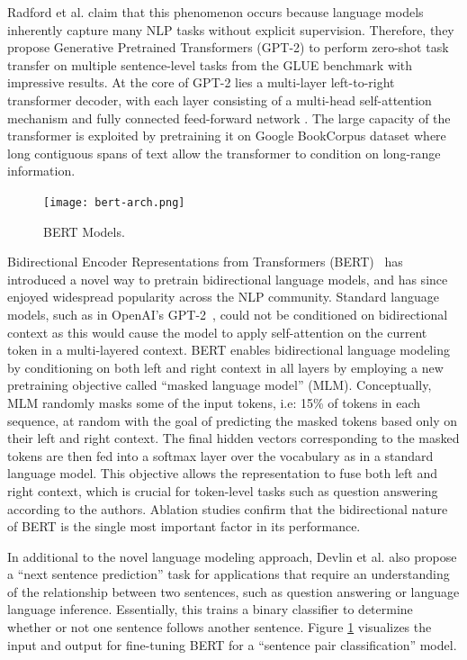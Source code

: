 Radford et al. \cite{radford2019language} claim that this phenomenon occurs because language models inherently capture many NLP tasks without explicit supervision.
Therefore, they propose Generative Pretrained Transformers (GPT-2) to perform zero-shot task transfer on multiple sentence-level tasks from the GLUE benchmark \cite{wang2018glue} with impressive results.
At the core of GPT-2 lies a multi-layer left-to-right transformer \cite{vaswani2017attention} decoder, with each layer consisting of a multi-head self-attention mechanism and fully connected feed-forward network \cite{radford2018improving}.
The large capacity of the transformer is exploited by pretraining it on Google BookCorpus dataset \cite{zhu2015aligning} where long contiguous spans of text allow the transformer to condition on long-range information.

\begin{figure}[b!]
\centering
  \texttt{[image: bert-arch.png]}
\caption{BERT Models.}
\label{fig:bert}
\end{figure}

Bidirectional Encoder Representations from Transformers (BERT)~\cite{devlin2018bert} has introduced a novel way to pretrain bidirectional language models, and has since enjoyed widespread popularity across the NLP community.
Standard language models, such as in OpenAI's GPT-2~\cite{radford2019language}, could not be conditioned on bidirectional context as this would cause the model to apply self-attention on the current token in a multi-layered context.
BERT enables bidirectional language modeling by conditioning on both left and right context in all layers by employing a new pretraining objective called ``masked language model'' (MLM).
Conceptually, MLM randomly masks some of the input tokens, i.e: 15\% of tokens in each sequence, at random with the goal of predicting the masked tokens based only on their left and right context.
The final hidden vectors corresponding to the masked tokens are then fed into a softmax layer over the vocabulary as in a standard language model.
This objective allows the representation to fuse both left and right context, which is crucial for token-level tasks such as question answering according to the authors.
Ablation studies confirm that the bidirectional nature of BERT is the single most important factor in its performance.

In additional to the novel language modeling approach, Devlin et al. \cite{devlin2018bert} also propose a ``next sentence prediction'' task for applications that require an understanding of the relationship between two sentences, such as question answering or language language inference.
Essentially, this trains a binary classifier to determine whether or not one sentence follows another sentence.
Figure \ref{fig:bert} visualizes the input and output for fine-tuning BERT for a ``sentence pair classification'' model.

